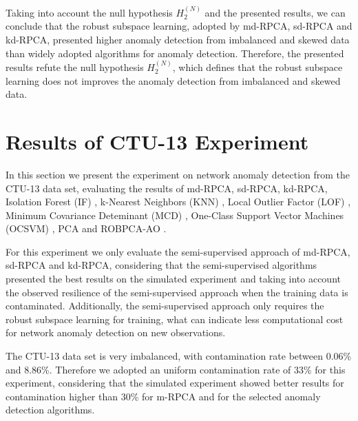 Taking into account the null hypothesis $H_2^{(N)}$ and the presented results, we can conclude that the robust subspace learning, adopted by md-RPCA, sd-RPCA and kd-RPCA, presented higher anomaly detection from imbalanced and skewed data than widely adopted algorithms for anomaly detection. Therefore, the presented results refute the null hypothesis $H_2^{(N)}$, which defines that the robust subspace learning does not improves the anomaly detection from imbalanced and skewed data.

\section{Results of CTU-13 Experiment}
\label{sec:3_ctu13_result}

In this section we present the experiment on network anomaly detection from the CTU-13 data set, evaluating the results of md-RPCA, sd-RPCA, kd-RPCA, Isolation Forest (IF) \cite{liu2008isolation}, k-Nearest Neighbors (KNN) \cite{angiulli2002fast}, Local Outlier Factor (LOF) \cite{breunig2000lof}, Minimum Covariance Deteminant (MCD) \cite{rousseeuw1999fastmcd}, One-Class Support Vector Machines (OCSVM) \cite{scholkopf2001estimating}, PCA \cite{shyu2003novel} and ROBPCA-AO \cite{hubert2009robustskewed}.

For this experiment we only evaluate the semi-supervised approach of md-RPCA, sd-RPCA and kd-RPCA, considering that the semi-supervised algorithms presented the best results on the simulated experiment and taking into account the observed resilience of the semi-supervised approach when the training data is contaminated. Additionally, the semi-supervised approach only requires the robust subspace learning for training, what can indicate less computational cost for network anomaly detection on new observations.

The CTU-13 data set is very imbalanced, with contamination rate between 0.06\% and 8.86\%. Therefore we adopted an uniform contamination rate of 33\% for this experiment, considering that the simulated experiment showed better results for contamination higher than 30\% for m-RPCA and for the selected anomaly detection algorithms.

